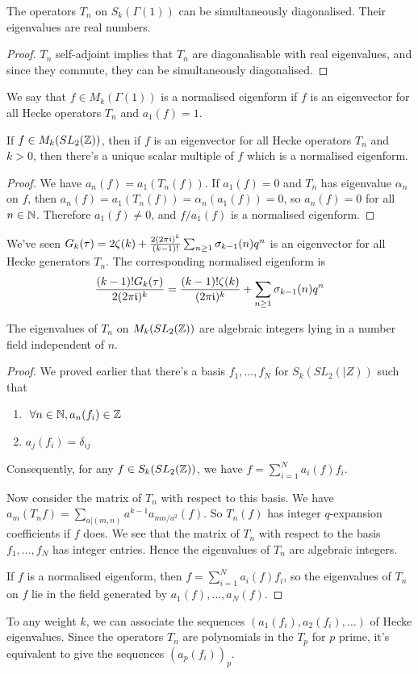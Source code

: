 \documentclass[10pt,a4paper]{article}
\begin{document}
\begin{corollary}
  The operators $T_n$ on $S_k(\Gamma(1))$ can be simultaneously diagonalised. Their eigenvalues are real numbers.
\end{corollary}
\begin{proof}
  $T_n$ self-adjoint implies that $T_n$ are diagonalisable with real eigenvalues, and since they commute, they can be simultaneously diagonalised.
\end{proof}
\begin{definition}
  We say that $f \in M_k(\Gamma(1))$ is a normalised eigenform if $f$ is an eigenvector for all Hecke operators $T_n$ and $a_1(f) = 1$.
\end{definition}
\begin{lemma}
  If $f \in M_k(SL_2(\mathbb{Z}))$, then if $f$ is an eigenvector for all Hecke operators $T_n$ and $k > 0$, then there's a unique scalar multiple of $f$ which is a normalised eigenform.
\end{lemma}
\begin{proof}
  We have $a_n(f) = a_1(T_n(f))$. If $a_1(f) = 0$ and $T_n$ has eigenvalue $\alpha_n$ on $f$, then $a_n(f) = a_1(T_n(f)) = \alpha_n(a_1(f)) =0$, so $a_n(f) = 0$ for all $n \in \mathbb{N}$. Therefore $a_1(f) \neq 0$, and $f/a_1(f)$ is a normalised eigenform.
\end{proof}
We've seen $G_k(\tau) =2\zeta(k) + \frac{2(2\pi\mathfrak{i})^k}{(k-1)!}\sum_{n\geq 1}\sigma_{k-1}(n)q^n$ is an eigenvector for all Hecke generators $T_n$. The corresponding normalised eigenform is
\[\frac{(k-1)!G_k(\tau)}{2(2\pi\mathfrak{i})^k} = \frac{(k-1)!\zeta(k)}{(2\pi\mathfrak{i})^k} + \sum_{n\geq 1}\sigma_{k-1}(n)q^n\]
\begin{proposition}
  The eigenvalues of $T_n$ on $M_k(SL_2(\mathbb{Z}))$ are algebraic integers lying in a number field independent of $n$.
\end{proposition}
\begin{proof}
  We proved earlier that there's a basis $f_1, \ldots, f_N$ for $S_k(SL_2(|Z))$ such that
  \begin{enumerate}
    \item $\forall n \in \N, a_n(f_i)\in \Z$
    \item $a_j(f_i) =\delta_{ij}$
  \end{enumerate}
  Consequently, for any $f \in S_k(SL_2(\mathbb{Z}))$, we have $f=\sum_{i=1}^N a_i(f)f_i$.

  Now consider the matrix of $T_n$ with respect to this basis. We have $a_m(T_n f) = \sum_{a|(m,n)}a^{k-1}a_{mn/a^2}(f)$. So $T_n(f)$ has integer $q$-expansion coefficients if $f$ does. We see that the matrix of $T_n$ with respect to the basis $f_1, \ldots, f_N$ has integer entries. Hence the eigenvalues of $T_n$ are algebraic integers.

  If $f$ is a normalised eigenform, then $f = \sum_{i=1}^N a_i(f)f_i$, so the eigenvalues of $T_n$ on $f$ lie in the field generated by $a_1(f),\ldots, a_N(f)$.
\end{proof}
To any weight $k$, we can associate the sequences $(a_1(f_i), a_2(f_i), \ldots)$ of Hecke eigenvalues. Since the operators $T_n$ are polynomials in the $T_p$ for $p$ prime, it's equivalent to give the sequences $(a_p(f_i))_p$.
\end{document}
